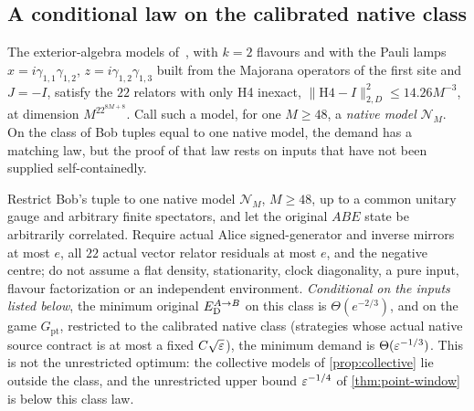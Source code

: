 \subsection{A conditional law on the calibrated native class}\label{sec:point-native}

The exterior-algebra models of~\cite[Proposition~6.5]{DM-H3}, with $k=2$ flavours and with the Pauli lamps
$x=i\gamma_{1,1}\gamma_{1,2}$, $z=i\gamma_{1,2}\gamma_{1,3}$ built from the Majorana operators of the first site and $J=-I$, satisfy the
$22$ relators with only H4 inexact, $\|\mathrm{H4}-I\|^2_{2,D}\le14.26M^{-3}$, at dimension $M^22^{8M+8}$. Call such a model, for one
$M\ge48$, a \emph{native model} $\mathcal N_M$. On the class of Bob tuples equal to one native model, the demand has a matching
law, but the proof of that law rests on inputs that have not been supplied self-containedly.

\begin{theorem}\label{thm:native}
Restrict Bob's tuple to one native model $\mathcal N_M$, $M\ge48$, up to a common unitary gauge and arbitrary finite spectators,
and let the original $ABE$ state be arbitrarily correlated. Require actual Alice signed-generator and inverse mirrors at most $e$,
all $22$ actual vector relator residuals at most $e$, and the negative centre; do not assume a flat density, stationarity, clock
diagonality, a pure input, flavour factorization or an independent environment. \emph{Conditional on the inputs listed
below}, the minimum original $E_{\mathrm D}^{A\to B}$ on this class is $\Theta(e^{-2/3})$, and on the game $G_{\mathrm{pt}}$, restricted to
the calibrated native class (strategies whose actual native source contract is at most a fixed $C\sqrt{\varepsilon}$), the minimum demand
is $\Theta(\varepsilon^{-1/3})$. This is not the unrestricted optimum: the collective models of \cref{prop:collective} lie outside the
class, and the unrestricted upper bound $\varepsilon^{-1/4}$ of \cref{thm:point-window} is below this class law.
\end{theorem}

